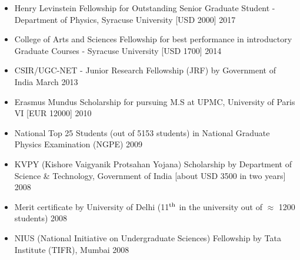 
 \begin{itemize}
 \item Henry Levinstein Fellowship for Outstanding Senior Graduate Student - Department of Physics, Syracuse University [USD 2000] \hfill 2017 
\item  College of Arts and Sciences Fellowship for best performance in introductory Graduate Courses - Syracuse University [USD 1700] \hfill 2014 
 \item CSIR/UGC-NET - Junior Research Fellowship (JRF) by Government of India \hfill March 2013
 \item Erasmus Mundus Scholarship for pursuing M.S at UPMC, University of Paris VI  [EUR 12000] \hfill \textsc{2010}
 \item National Top 25 Students (out of 5153 students) in National Graduate Physics Examination (NGPE) \hfill \textsc{2009}
  \item KVPY (Kishore Vaigyanik Protsahan Yojana) Scholarship by Department of Science \& Technology, Government of India [about USD 3500 in two years] \hfill 2008
 \item Merit certificate by University of Delhi (11$^{\rm{th}}$ in the university out of $\approx$ 1200 students) \hfill 2008
 \item NIUS (National Initiative on Undergraduate Sciences) Fellowship by Tata Institute (TIFR), Mumbai  \hfill 2008
 \end{itemize} 
